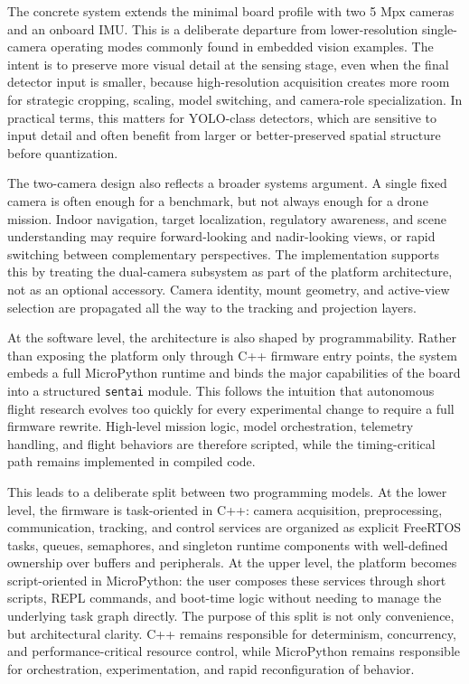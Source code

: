 The concrete system extends the minimal board profile with two 5 Mpx
cameras and an onboard IMU. This is a deliberate departure from
lower-resolution single-camera operating modes commonly found in
embedded vision examples. The intent is to preserve more visual detail
at the sensing stage, even when the final detector input is smaller,
because high-resolution acquisition creates more room for strategic
cropping, scaling, model switching, and camera-role specialization. In
practical terms, this matters for YOLO-class detectors, which are
sensitive to input detail and often benefit from larger or
better-preserved spatial structure before quantization.

The two-camera design also reflects a broader systems argument. A single
fixed camera is often enough for a benchmark, but not always enough for
a drone mission. Indoor navigation, target localization, regulatory
awareness, and scene understanding may require forward-looking and
nadir-looking views, or rapid switching between complementary
perspectives. The implementation supports this by treating the
dual-camera subsystem as part of the platform architecture, not as an
optional accessory. Camera identity, mount geometry, and active-view
selection are propagated all the way to the tracking and projection
layers.

At the software level, the architecture is also shaped by
programmability. Rather than exposing the platform only through C++
firmware entry points, the system embeds a full MicroPython runtime and
binds the major capabilities of the board into a structured
\texttt{sentai} module. This follows the intuition that autonomous
flight research evolves too quickly for every experimental change to
require a full firmware rewrite. High-level mission logic, model
orchestration, telemetry handling, and flight behaviors are therefore
scripted, while the timing-critical path remains implemented in compiled
code.

This leads to a deliberate split between two programming models. At the
lower level, the firmware is task-oriented in C++: camera acquisition,
preprocessing, communication, tracking, and control services are
organized as explicit FreeRTOS tasks, queues, semaphores, and singleton
runtime components with well-defined ownership over buffers and
peripherals. At the upper level, the platform becomes script-oriented in
MicroPython: the user composes these services through short scripts,
REPL commands, and boot-time logic without needing to manage the
underlying task graph directly. The purpose of this split is not only
convenience, but architectural clarity. C++ remains responsible for
determinism, concurrency, and performance-critical resource control,
while MicroPython remains responsible for orchestration,
experimentation, and rapid reconfiguration of behavior.

